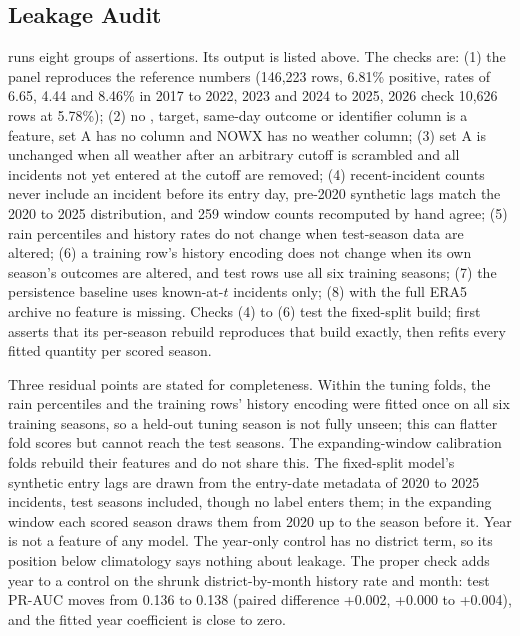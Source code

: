 \documentclass[conference]{IEEEtran}
\begin{document}
\begin{table}[!t]
\caption{Leave-one-season-out PR-AUC of each chosen setting by held-out season (set A), with the season's positive rate.}
\label{tab:folds}
\centering
\scriptsize
\setlength{\tabcolsep}{3.5pt}

\end{table}

\begin{table}[!t]
\caption{Alert outcomes at the 5\% budget on test 2024 to 2025 under the expanding window (1,624 alerts, 2,749 positives).}
\label{tab:counts}
\centering
\scriptsize

\end{table}

\subsection{Leakage Audit}
 runs eight groups of assertions. Its output is listed above. The checks are: (1) the panel reproduces the reference numbers (146,223 rows, 6.81\% positive, rates of 6.65, 4.44 and 8.46\% in 2017 to 2022, 2023 and 2024 to 2025, 2026 check 10,626 rows at 5.78\%); (2) no , target, same-day outcome or identifier column is a feature, set A has no  column and NOWX has no weather column; (3) set A is unchanged when all weather after an arbitrary cutoff is scrambled and all incidents not yet entered at the cutoff are removed; (4) recent-incident counts never include an incident before its entry day, pre-2020 synthetic lags match the 2020 to 2025 distribution, and 259 window counts recomputed by hand agree; (5) rain percentiles and history rates do not change when test-season data are altered; (6) a training row's history encoding does not change when its own season's outcomes are altered, and test rows use all six training seasons; (7) the persistence baseline uses known-at-$t$ incidents only; (8) with the full ERA5 archive no feature is missing. Checks (4) to (6) test the fixed-split build;  first asserts that its per-season rebuild reproduces that build exactly, then refits every fitted quantity per scored season.

Three residual points are stated for completeness. Within the tuning folds, the rain percentiles and the training rows' history encoding were fitted once on all six training seasons, so a held-out tuning season is not fully unseen; this can flatter fold scores but cannot reach the test seasons. The expanding-window calibration folds rebuild their features and do not share this. The fixed-split model's synthetic entry lags are drawn from the entry-date metadata of 2020 to 2025 incidents, test seasons included, though no label enters them; in the expanding window each scored season draws them from 2020 up to the season before it. Year is not a feature of any model. The year-only control has no district term, so its position below climatology says nothing about leakage. The proper check adds year to a control on the shrunk district-by-month history rate and month: test PR-AUC moves from 0.136 to 0.138 (paired difference +0.002, +0.000 to +0.004), and the fitted year coefficient is close to zero.
\end{document}
